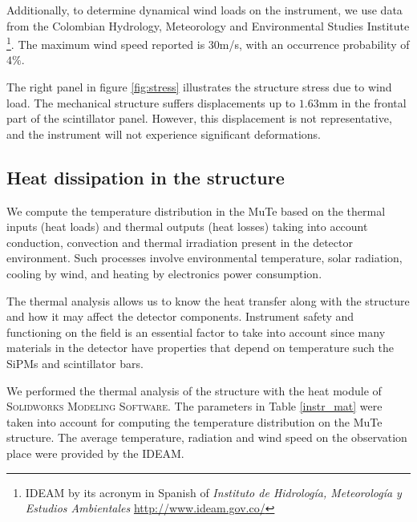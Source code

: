 \documentclass[letterpaper,11pt]{article}
\begin{document}
Additionally, to determine dynamical wind loads on the instrument, we use data from the Colombian Hydrology, Meteorology and Environmental Studies Institute \footnote{IDEAM by its acronym in Spanish of \textit{Instituto de Hidrología, Meteorología y Estudios Ambientales} \url{http://www.ideam.gov.co/}}. The maximum wind speed reported is $30$m/s, with an occurrence probability of $4\%$.


The right panel in figure \ref{fig:stress} illustrates the structure stress due to wind load. The mechanical structure suffers displacements up to $1.63$mm in the frontal part of the scintillator panel. However, this displacement is not representative, and the instrument will not experience significant deformations.

\subsection{Heat dissipation in the structure}
We compute the temperature distribution in the MuTe based on the thermal inputs (heat loads) and thermal outputs (heat losses) taking into account conduction, convection and thermal irradiation present in the detector environment. Such processes involve environmental temperature, solar radiation, cooling by wind, and heating by electronics power consumption.

The thermal analysis allows us to know the heat transfer along with the structure and how it may affect the detector components. Instrument safety and functioning on the field is an essential factor to take into account since many materials in the detector have properties that depend on temperature such the SiPMs and scintillator bars.

We performed the thermal analysis of the structure with the heat module of \textsc{Solidworks Modeling Software}. The parameters in Table \ref{instr_mat} were taken into account for computing the temperature distribution on the MuTe structure. The average temperature, radiation and wind speed on the observation place were provided by the IDEAM.
\end{document}
